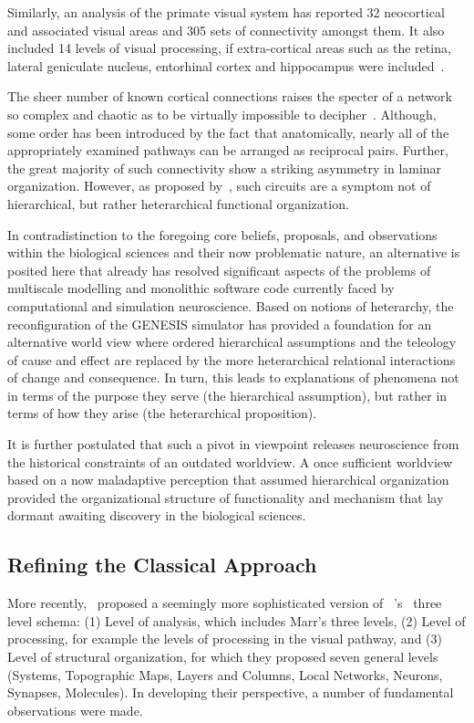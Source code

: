 \documentclass[11pt,3p,twocolumn]{JMN}
\begin{document}
Similarly, an analysis of the primate visual system has reported 32 neocortical and associated visual areas and 305 sets of connectivity amongst them. It also included 14 levels of visual processing, if extra-cortical areas such as the retina, lateral geniculate nucleus, entorhinal cortex and hippocampus were included~\citep[see Fig.\,4,][]{felleman91}. 

The sheer number of known cortical connections raises the specter of a network so complex and chaotic as to be virtually impossible to decipher~\citep{vanessen93}. Although, some order has been introduced by the fact that anatomically, nearly all of the appropriately examined pathways can be arranged as reciprocal pairs. Further, the great majority of such connectivity show a striking asymmetry in laminar organization. However, as proposed by~\citet{mcculloch45a,mcculloch45b}, such circuits are a symptom not of hierarchical, but rather heterarchical functional organization.

In contradistinction to the foregoing core beliefs, proposals, and observations within the biological sciences and their now problematic nature, an alternative is posited here that already has resolved significant aspects of the problems of  multiscale modelling and monolithic software code currently faced by computational and simulation neuroscience. Based on notions of heterarchy, the reconfiguration of the GENESIS simulator has provided a foundation for an alternative world view where ordered hierarchical assumptions and the teleology of cause and effect are replaced by the more heterarchical relational interactions of change and consequence. In turn, this leads to explanations of phenomena not in terms of the purpose they serve (the hierarchical assumption), but rather in terms of how they arise (the heterarchical proposition).

It is further postulated that such a pivot in viewpoint releases neuroscience from the historical constraints of an outdated worldview. A once sufficient worldview based on a now maladaptive perception that assumed hierarchical organization provided the organizational structure of functionality and mechanism that lay dormant awaiting discovery in the biological sciences.

\subsection{Refining the Classical Approach}

More recently,~\citet[][C\&S]{Churchland:1992uq} proposed a seemingly more sophisticated version of ~\citeauthor{Marr:1982fk}'s~\citeyear{Marr:1982fk} three level schema: (1) Level of analysis, which includes Marr’s three levels, (2) Level of processing, for example the levels of processing in the visual pathway, and (3) Level of structural organization, for which they proposed seven general levels (Systems, Topographic Maps, Layers and Columns, Local Networks, Neurons, Synapses, Molecules). In developing their perspective, a number of fundamental observations were made.
\end{document}
